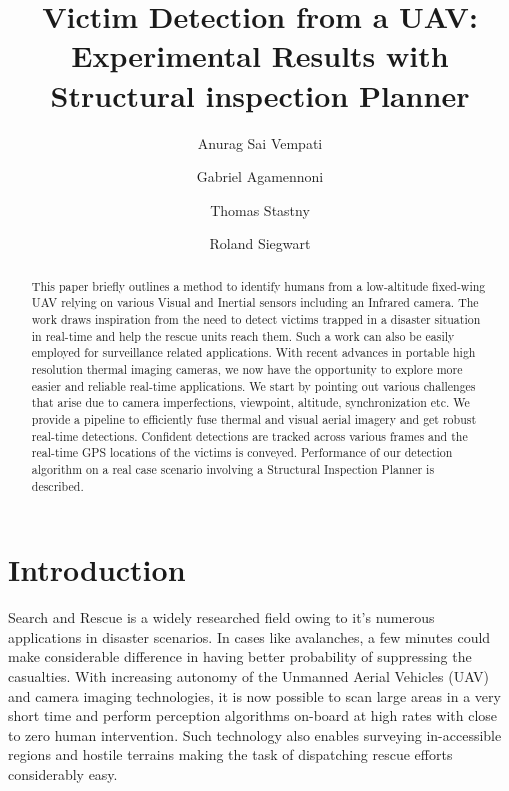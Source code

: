 \documentclass[runningheads]{llncs}
\begin{document}
\pagestyle{headings}

\mainmatter

\title{Victim Detection from a UAV: Experimental Results with Structural inspection Planner}

\author{Anurag Sai Vempati \and Gabriel Agamennoni \and
Thomas Stastny \and Roland Siegwart}





\maketitle

\begin{abstract}
This paper briefly outlines a method to identify humans from a low-altitude fixed-wing UAV relying on various Visual and Inertial sensors including an Infrared camera. The work draws inspiration from the need to detect victims trapped in a disaster situation in real-time and help the rescue units reach them. Such a work can also be easily employed for surveillance related applications. With recent advances in portable high resolution thermal imaging cameras, we now have the opportunity to explore more easier and reliable real-time applications. We start by pointing out various challenges that arise due to camera imperfections, viewpoint, altitude, synchronization etc. We provide a pipeline to efficiently fuse thermal and visual aerial imagery and get robust real-time detections. Confident detections are tracked across various frames and the real-time GPS locations of the victims is conveyed. Performance of our detection algorithm on a real case scenario involving a Structural Inspection Planner is described.
\end{abstract}


\section{Introduction}
Search and Rescue is a widely researched field owing to it's numerous applications in disaster scenarios. In cases like avalanches, a few minutes could make considerable difference in having better probability of suppressing the casualties. With increasing autonomy of the Unmanned Aerial Vehicles (UAV) and camera imaging technologies, it is now possible to scan large areas in a very short time and perform perception algorithms on-board at high rates with close to zero human intervention. Such technology also enables surveying in-accessible regions and hostile terrains making the task of dispatching rescue efforts considerably easy.
\end{document}
